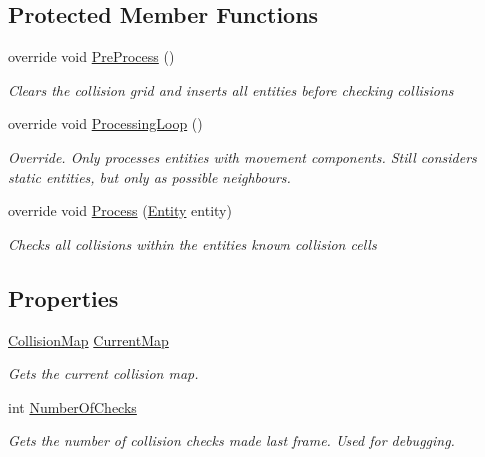 \subsection*{Protected Member Functions}
\begin{DoxyCompactItemize}
\item 
override void \hyperlink{class_m_b2_d_1_1_entity_component_1_1_collision_system_ad591227767c8b6c66ca3891de04e9050}{Pre\+Process} ()
\begin{DoxyCompactList}\small\item\em Clears the collision grid and inserts all entities before checking collisions \end{DoxyCompactList}\item 
override void \hyperlink{class_m_b2_d_1_1_entity_component_1_1_collision_system_a06249adc606475cdc35f28783a1b27c4}{Processing\+Loop} ()
\begin{DoxyCompactList}\small\item\em Override. Only processes entities with movement components. Still considers static entities, but only as possible neighbours. \end{DoxyCompactList}\item 
override void \hyperlink{class_m_b2_d_1_1_entity_component_1_1_collision_system_adfbee070ed7b120565a5f8a08c159535}{Process} (\hyperlink{class_m_b2_d_1_1_entity_component_1_1_entity}{Entity} entity)
\begin{DoxyCompactList}\small\item\em Checks all collisions within the entities known collision cells \end{DoxyCompactList}\end{DoxyCompactItemize}
\subsection*{Properties}
\begin{DoxyCompactItemize}
\item 
\hyperlink{class_m_b2_d_1_1_collision_1_1_collision_map}{Collision\+Map} \hyperlink{class_m_b2_d_1_1_entity_component_1_1_collision_system_a338aebc3f288cf68926074026af3dbba}{Current\+Map}
\begin{DoxyCompactList}\small\item\em Gets the current collision map. \end{DoxyCompactList}\item 
int \hyperlink{class_m_b2_d_1_1_entity_component_1_1_collision_system_a9448df47918780c8287b6f7ff177d46f}{Number\+Of\+Checks}
\begin{DoxyCompactList}\small\item\em Gets the number of collision checks made last frame. Used for debugging. \end{DoxyCompactList}\end{DoxyCompactItemize}
